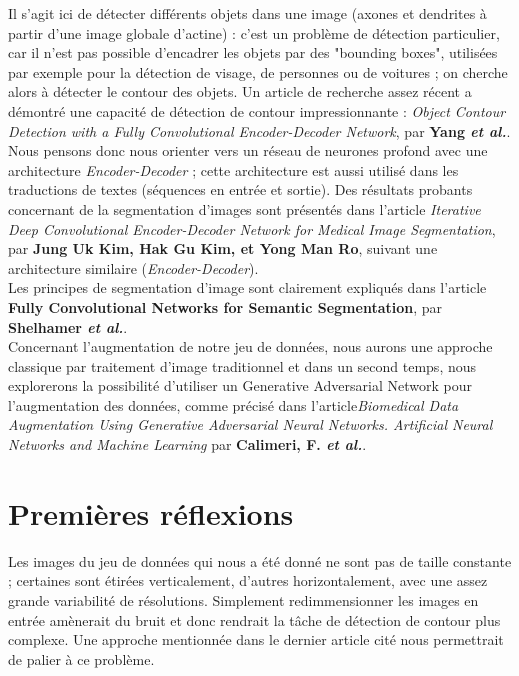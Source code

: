 \documentclass{report}
\begin{document}
Il s'agit ici de détecter différents objets dans une image (axones et dendrites
à partir d'une image globale d'actine) : c'est un problème de détection particulier,
car il n'est pas possible d'encadrer les objets par des "bounding boxes", utilisées
par exemple pour la détection de visage, de personnes ou de voitures ; on cherche
alors à détecter le contour des objets. Un article de recherche assez récent a
démontré une capacité de détection de contour impressionnante : \textit{Object Contour
 Detection with a Fully Convolutional Encoder-Decoder Network}, par \textbf{Yang
 \textit{et al.}}. Nous pensons donc nous orienter vers un réseau de neurones profond
avec une architecture \textit{Encoder-Decoder} ; cette architecture est aussi
utilisé dans les traductions de textes (séquences en entrée et sortie). Des résultats
probants concernant de la segmentation d'images sont présentés dans l'article
\textit{Iterative Deep Convolutional Encoder-Decoder Network for Medical Image
 Segmentation}, par \textbf{Jung Uk Kim, Hak Gu Kim, et Yong Man Ro}, suivant une
architecture similaire (\textit{Encoder-Decoder}). \\
Les principes de segmentation d'image sont clairement expliqués dans l'article
\textbf{Fully Convolutional Networks for Semantic Segmentation}, par \textbf{Shelhamer
 \textit{et al.}}. \\
Concernant l’augmentation de notre jeu de données, nous aurons une approche
classique par traitement d’image traditionnel et dans un second temps, nous
explorerons la possibilité d'utiliser un Generative Adversarial Network pour l’augmentation
des données, comme précisé dans l'article\textit{Biomedical Data Augmentation Using
Generative Adversarial Neural Networks. Artificial Neural Networks and Machine
Learning} par \textbf{Calimeri, F.
 \textit{et al.}}.

\section{Premières réflexions}

Les images du jeu de données qui nous a été donné ne sont pas de taille constante ;
certaines sont étirées verticalement, d'autres horizontalement, avec une assez
grande variabilité de résolutions. Simplement redimmensionner les images en entrée
amènerait du bruit et donc rendrait la tâche de détection de contour plus complexe.
Une approche mentionnée dans le dernier article cité nous permettrait de palier
à ce problème.
\end{document}

